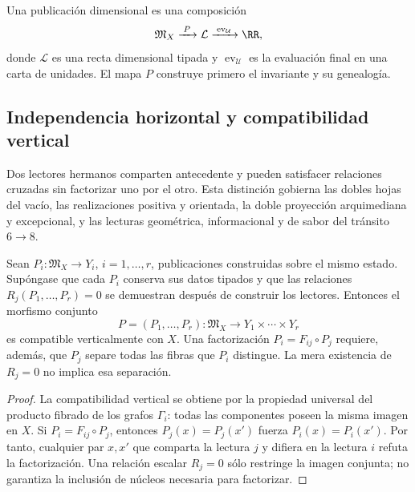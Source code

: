 \begin{definition}
Una publicaci\'on dimensional es una composici\'on
\begin{equation}
 \mathfrak M_X\xrightarrow{\;P\;}\mathcal L
 \xrightarrow{\;\operatorname{ev}_{\mathcal U}\;}\RR,
 \label{rm:eq:dimensional-publication}
\end{equation}
donde \(\mathcal L\) es una recta dimensional tipada y
\(\operatorname{ev}_{\mathcal U}\) es la evaluaci\'on final en una carta de
unidades. El mapa \(P\) construye primero el invariante y su genealog\'ia.
\end{definition}

\subsection{Independencia horizontal y compatibilidad vertical}

Dos lectores hermanos comparten antecedente y pueden satisfacer relaciones
cruzadas sin factorizar uno por el otro.  Esta distinci\'on gobierna las
dobles hojas del vac\'io, las realizaciones positiva y orientada, la doble
proyecci\'on arquimediana y excepcional, y las lecturas geom\'etrica,
informacional y de sabor del tr\'ansito \(6\to8\).

\begin{theorem}
Sean \(P_i:\mathfrak M_X\to Y_i\), \(i=1,\ldots,r\), publicaciones
construidas sobre el mismo estado. Sup\'ongase que cada \(P_i\) conserva sus
datos tipados y que las relaciones \(R_j(P_1,\ldots,P_r)=0\) se demuestran
despu\'es de construir los lectores.  Entonces el morfismo conjunto
\begin{equation}
 P=(P_1,\ldots,P_r):\mathfrak M_X\longrightarrow
 Y_1\times\cdots\times Y_r
 \label{rm:eq:joint-publication}
\end{equation}
es compatible verticalmente con \(X\). Una factorizaci\'on
\(P_i=F_{ij}\circ P_j\) requiere, adem\'as, que \(P_j\) separe todas las
fibras que \(P_i\) distingue. La mera existencia de \(R_j=0\) no implica
esa separaci\'on.
\end{theorem}

\begin{proof}
La compatibilidad vertical se obtiene por la propiedad universal del
producto fibrado de los grafos \(\Gamma_i\): todas las componentes poseen
la misma imagen en \(X\).
Si \(P_i=F_{ij}\circ P_j\), entonces
\(P_j(x)=P_j(x')\) fuerza \(P_i(x)=P_i(x')\). Por tanto, cualquier par
\(x,x'\) que comparta la lectura \(j\) y difiera en la lectura \(i\) refuta
la factorizaci\'on. Una relaci\'on escalar \(R_j=0\) s\'olo restringe la imagen
conjunta; no garantiza la inclusi\'on de n\'ucleos necesaria para factorizar.
\end{proof}

